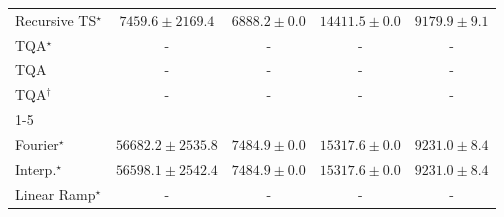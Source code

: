 \begin{tabular}{l|cccc|}
Recursive TS$^\star$ & {\cellcolor[HTML]{FFFEE2}} \color[HTML]{000000} $7459.6\pm 2169.4$ & {\cellcolor[HTML]{FFFFE5}} \color[HTML]{000000} $6888.2\pm 0.0$ & {\cellcolor[HTML]{FFF3B4}} \color[HTML]{000000} $14411.5\pm 0.0$ & {\cellcolor[HTML]{FFFCD7}} \color[HTML]{000000} $9179.9\pm 9.1$ \\
TQA$^\star$ & {\cellcolor[HTML]{000000}} \color[HTML]{F1F1F1} {\cellcolor{white}} \color{black} - & {\cellcolor[HTML]{000000}} \color[HTML]{F1F1F1} {\cellcolor{white}} \color{black} - & {\cellcolor[HTML]{000000}} \color[HTML]{F1F1F1} {\cellcolor{white}} \color{black} - & {\cellcolor[HTML]{000000}} \color[HTML]{F1F1F1} {\cellcolor{white}} \color{black} - \\
TQA & {\cellcolor[HTML]{000000}} \color[HTML]{F1F1F1} {\cellcolor{white}} \color{black} - & {\cellcolor[HTML]{000000}} \color[HTML]{F1F1F1} {\cellcolor{white}} \color{black} - & {\cellcolor[HTML]{000000}} \color[HTML]{F1F1F1} {\cellcolor{white}} \color{black} - & {\cellcolor[HTML]{000000}} \color[HTML]{F1F1F1} {\cellcolor{white}} \color{black} - \\
TQA$^\dagger$ & {\cellcolor[HTML]{000000}} \color[HTML]{F1F1F1} {\cellcolor{white}} \color{black} - & {\cellcolor[HTML]{000000}} \color[HTML]{F1F1F1} {\cellcolor{white}} \color{black} - & {\cellcolor[HTML]{000000}} \color[HTML]{F1F1F1} {\cellcolor{white}} \color{black} - & {\cellcolor[HTML]{000000}} \color[HTML]{F1F1F1} {\cellcolor{white}} \color{black} - \\
\cline{1-5}
\multicolumn{5}{c}{\rule{0pt}{8pt}PP} \\
\midrule
Fourier$^\star$ & {\cellcolor[HTML]{004529}} \color[HTML]{F1F1F1} $56682.2\pm 2535.8$ & {\cellcolor[HTML]{FEFFE1}} \color[HTML]{000000} $7484.9\pm 0.0$ & {\cellcolor[HTML]{EDF8B1}} \color[HTML]{000000} $15317.6\pm 0.0$ & {\cellcolor[HTML]{FCFED4}} \color[HTML]{000000} $9231.0\pm 8.4$ \\
Interp.$^\star$ & {\cellcolor[HTML]{004529}} \color[HTML]{F1F1F1} $56598.1\pm 2542.4$ & {\cellcolor[HTML]{FEFFE1}} \color[HTML]{000000} $7484.9\pm 0.0$ & {\cellcolor[HTML]{EDF8B1}} \color[HTML]{000000} $15317.6\pm 0.0$ & {\cellcolor[HTML]{FCFED4}} \color[HTML]{000000} $9231.0\pm 8.4$ \\
Linear Ramp$^\star$ & {\cellcolor[HTML]{000000}} \color[HTML]{F1F1F1} {\cellcolor{white}} \color{black} - & {\cellcolor[HTML]{000000}} \color[HTML]{F1F1F1} {\cellcolor{white}} \color{black} - & {\cellcolor[HTML]{000000}} \color[HTML]{F1F1F1} {\cellcolor{white}} \color{black} - & {\cellcolor[HTML]{000000}} \color[HTML]{F1F1F1} {\cellcolor{white}} \color{black} - \\

\end{tabular}
